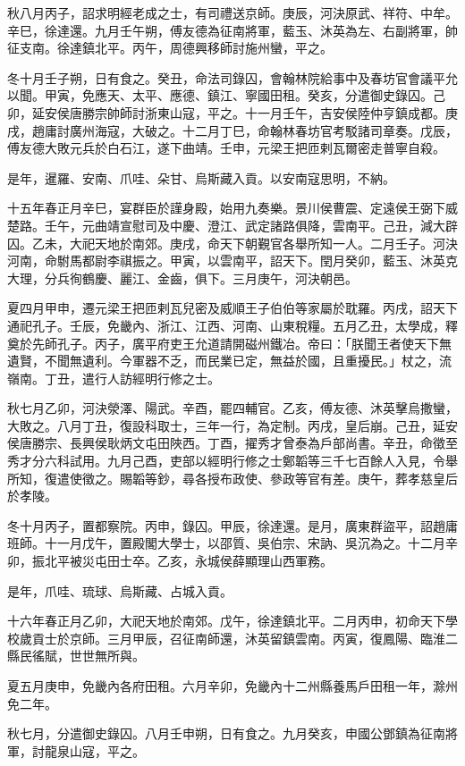 \begin{pinyinscope}
秋八月丙子，詔求明經老成之士，有司禮送京師。庚辰，河決原武、祥符、中牟。辛巳，徐達還。九月壬午朔，傅友德為征南將軍，藍玉、沐英為左、右副將軍，帥征支南。徐達鎮北平。丙午，周德興移師討施州蠻，平之。

冬十月壬子朔，日有食之。癸丑，命法司錄囚，會翰林院給事中及春坊官會議平允以聞。甲寅，免應天、太平、應德、鎮江、寧國田租。癸亥，分遣御史錄囚。己卯，延安侯唐勝宗帥師討浙東山寇，平之。十一月壬午，吉安侯陸仲亨鎮成都。庚戌，趙庸討廣州海寇，大破之。十二月丁巳，命翰林春坊官考駁諸司章奏。戊辰，傅友德大敗元兵於白石江，遂下曲靖。壬申，元梁王把匝剌瓦爾密走普寧自殺。

是年，暹羅、安南、爪哇、朵甘、烏斯藏入貢。以安南寇思明，不納。

十五年春正月辛巳，宴群臣於謹身殿，始用九奏樂。景川侯曹震、定遠侯王弼下威楚路。壬午，元曲靖宣慰司及中慶、澄江、武定諸路俱降，雲南平。己丑，減大辟囚。乙未，大祀天地於南郊。庚戌，命天下朝覲官各舉所知一人。二月壬子。河決河南，命駙馬都尉李祺振之。甲寅，以雲南平，詔天下。閏月癸卯，藍玉、沐英克大理，分兵徇鶴慶、麗江、金齒，俱下。三月庚午，河決朝邑。

夏四月甲申，遷元梁王把匝剌瓦兒密及威順王子伯伯等家屬於耽羅。丙戌，詔天下通祀孔子。壬辰，免畿內、浙江、江西、河南、山東稅糧。五月乙丑，太學成，釋奠於先師孔子。丙子，廣平府吏王允道請開磁州鐵冶。帝曰：「朕聞王者使天下無遺賢，不聞無遺利。今軍器不乏，而民業已定，無益於國，且重擾民。」杖之，流嶺南。丁丑，遣行人訪經明行修之士。

秋七月乙卯，河決滎澤、陽武。辛酉，罷四輔官。乙亥，傅友德、沐英擊烏撒蠻，大敗之。八月丁丑，復設科取士，三年一行，為定制。丙戌，皇后崩。己丑，延安侯唐勝宗、長興侯耿炳文屯田陜西。丁酉，擢秀才曾泰為戶部尚書。辛丑，命徵至秀才分六科試用。九月己酉，吏部以經明行修之士鄭韜等三千七百餘人入見，令舉所知，復遣使徵之。賜韜等鈔，尋各授布政使、參政等官有差。庚午，葬孝慈皇后於孝陵。

冬十月丙子，置都察院。丙申，錄囚。甲辰，徐達還。是月，廣東群盜平，詔趙庸班師。十一月戊午，置殿閣大學士，以邵質、吳伯宗、宋訥、吳沉為之。十二月辛卯，振北平被災屯田士卒。乙亥，永城侯薛顯理山西軍務。

是年，爪哇、琉球、烏斯藏、占城入貢。

十六年春正月乙卯，大祀天地於南郊。戊午，徐達鎮北平。二月丙申，初命天下學校歲貢士於京師。三月甲辰，召征南師還，沐英留鎮雲南。丙寅，復鳳陽、臨淮二縣民徭賦，世世無所與。

夏五月庚申，免畿內各府田租。六月辛卯，免畿內十二州縣養馬戶田租一年，滁州免二年。

秋七月，分遣御史錄囚。八月壬申朔，日有食之。九月癸亥，申國公鄧鎮為征南將軍，討龍泉山寇，平之。


\end{pinyinscope}
